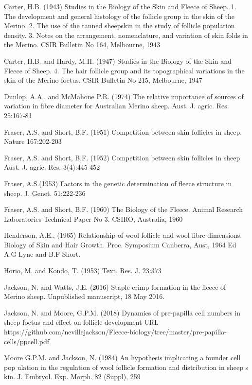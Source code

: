 \documentclass[titlepage]{article}  %
\begin{document}
\begin{thebibliography}{99}

Carter, H.B. (1943) Studies in the Biology of the Skin and Fleece of Sheep. 1. The development and general histology of the follicle group in the skin of the Merino. 2. The use of the tanned sheepskin in the study of follicle population density. 3. Notes on the arrangement, nomenclature, and variation of skin folds in the Merino. CSIR Bulletin No 164, Melbourne, 1943

Carter, H.B. and Hardy, M.H. (1947) Studies in the Biology of the Skin and Fleece of Sheep. 4. The hair follicle group and its topographical variations in the skin of the Merino foetus. CSIR Bulletin No 215, Melbourne, 1947

Dunlop, A.A., and McMahone P.R. (1974)  The relative importance of sources of variation in fibre diameter for Australian Merino sheep. Aust. J. agric. Res. 25:167-81

Fraser, A.S. and Short, B.F. (1951) Competition between skin follicles in sheep. Nature 167:202-203

Fraser, A.S. and Short, B.F. (1952) Competition between skin follicles in sheep Aust. J. agric. Res. 3(4):445-452

Fraser, A.S.(1953) Factors in the genetic determination of fleece structure in sheep. J. Genet. 51:222-236

Fraser, A.S. and Short, B.F. (1960) The Biology of the Fleece. Animal Research Laboratories Technical Paper No 3. CSIRO, Australia, 1960

Henderson, A.E., (1965) Relationship of wool follicle and wool fibre dimensions. Biology of Skin and Hair Growth. Proc. Symposium Canberra, Aust, 1964 Ed A.G Lyne and B.F Short.

Horio, M. and Kondo, T. (1953) Text. Res. J. 23:373

Jackson, N. and Watts, J.E. (2016) Staple crimp formation in the fleece of Merino sheep. Unpublished manuscript, 18 May 2016.


Jackson, N. and Moore, G.P.M. (2018)
Dynamics of pre-papilla cell numbers in sheep foetus and effect on follicle development URL https://github.com/nevillejackson/Fleece-biology/tree/master/pre-papilla-cells/ppcell.pdf

Moore G.P.M. and Jackson, N. (1984) An hypothesis implicating a founder cell pop
ulation in the regulation of wool follicle formation and distribution in sheep s
kin. J. Embryol. Exp. Morph. 82 (Suppl), 259


\end{thebibliography}
\end{document}
